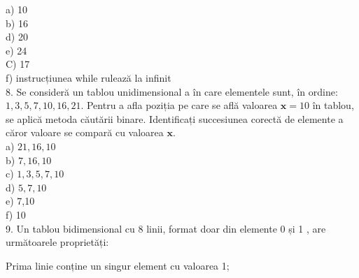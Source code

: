 a) 10\\
b) 16\\
d) 20\\
e) 24\\
C) 17\\
f) instrucțiunea while rulează la infinit\\
8. Se consideră un tablou unidimensional a în care elementele sunt, în ordine: $1,3,5,7,10,16,21$. Pentru a afla poziția pe care se află valoarea $\mathbf{x}=10$ în tablou, se aplică metoda căutării binare. Identificați succesiunea corectă de elemente a căror valoare se compară cu valoarea $\mathbf{x}$.\\
a) $21,16,10$\\
b) $7,16,10$\\
c) $1,3,5,7,10$\\
d) $5,7,10$\\
e) 7,10\\
f) 10\\
9. Un tablou bidimensional cu 8 linii, format doar din elemente 0 și 1 , are următoarele proprietăți:

Prima linie conține un singur element cu valoarea 1;

